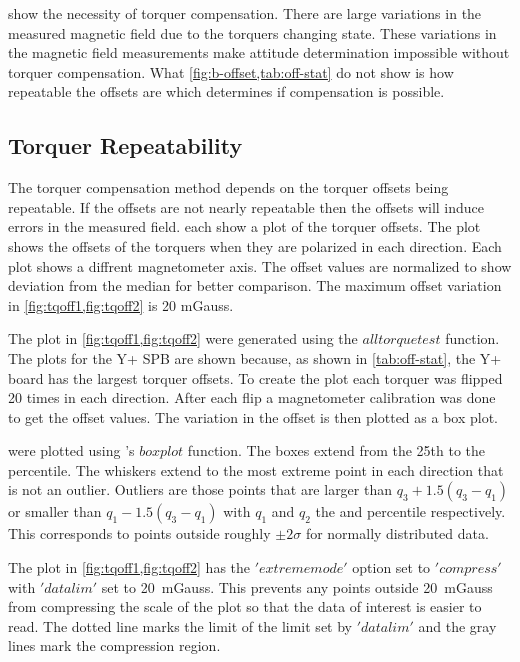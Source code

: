  show the necessity of torquer compensation. There are large variations in the measured magnetic field due to the torquers changing state. These variations in the magnetic field measurements make attitude determination impossible without torquer compensation. What \cref{fig:b-offset,tab:off-stat} do not show is how repeatable the offsets are which determines if compensation is possible. 

\subsection{Torquer Repeatability}

The torquer compensation method depends on the torquer offsets being repeatable. If the offsets are not nearly repeatable then the offsets will induce errors in the measured field.  each show a plot of the torquer offsets. The plot shows the offsets of the torquers when they are polarized in each direction. Each plot shows a diffrent magnetometer axis. The offset values are normalized to show deviation from the median for better comparison. The maximum offset variation in \cref{fig:tqoff1,fig:tqoff2} is 20 mGauss.

The plot in \cref{fig:tqoff1,fig:tqoff2} were generated using the \lstMat$alltorquetest$ function. The plots for the Y+ \ac{SPB} are shown because, as shown in \cref{tab:off-stat}, the Y+ board has the largest torquer offsets. To create the plot each torquer was flipped 20 times in each direction. After each flip a magnetometer calibration was done to get the offset values. The variation in the offset is then plotted as a box plot.

 were plotted using \matlab's \lstMat$boxplot$ function. The boxes extend from the 25th to the  percentile. The whiskers extend to the most extreme point in each direction that is not an outlier. Outliers are those points that are larger than $q_3 + 1.5 \left( q_3 - q_1 \right)$ or smaller than $q_1 - 1.5 \left( q_3 - q_1 \right)$ with $q_1$ and $q_2$ the  and  percentile respectively. This corresponds to points outside roughly $\pm 2 \sigma$ for normally distributed data. \cite{MatBox}

The plot in \cref{fig:tqoff1,fig:tqoff2} has the \lstMat$'extrememode'$ option set to \lstMat$'compress'$ with \lstMat$'datalim'$ set to \textpm{}20~mGauss. This prevents any points outside \textpm{}20~mGauss from compressing the scale of the plot so that the data of interest is easier to read. The dotted line marks the limit of the limit set by \lstMat$'datalim'$ and the gray lines mark the compression region. \cite{MatBox}


